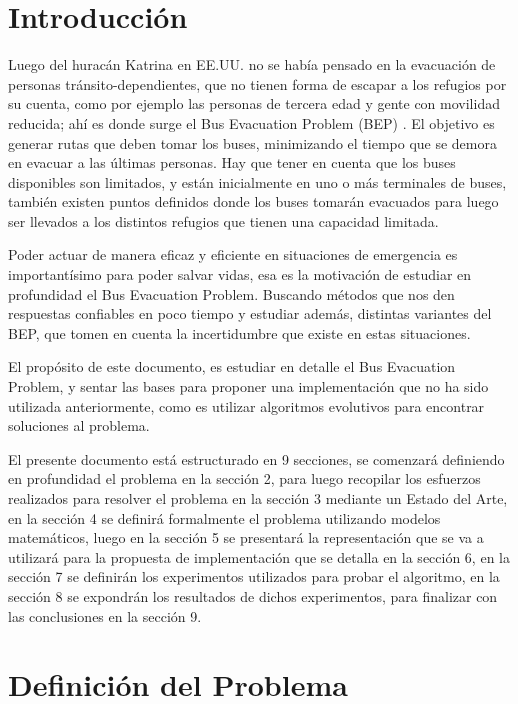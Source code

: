 \documentclass[letter, 10pt]{article}
\begin{document}
\section{Introducci\'on}
    Luego del huracán Katrina en EE.UU. no se había pensado en la evacuación de personas tránsito-dependientes, que no tienen forma de escapar a los refugios por su cuenta, como por ejemplo las personas de tercera edad y gente con movilidad reducida; ahí es donde surge el Bus Evacuation Problem (BEP) \cite{bish2011planning}. El objetivo es generar rutas que deben tomar los buses, minimizando el tiempo que se demora en evacuar a las últimas personas. Hay que tener en cuenta que los buses disponibles son limitados, y están inicialmente en uno o más terminales de buses, también existen puntos definidos donde los buses tomarán evacuados para luego ser llevados a los distintos refugios que tienen una capacidad limitada.

Poder actuar de manera eficaz y eficiente en situaciones de emergencia es importantísimo para poder salvar vidas, esa es la motivación de estudiar en profundidad el Bus Evacuation Problem. Buscando métodos que nos den respuestas confiables en poco tiempo y estudiar además, distintas variantes del BEP, que tomen en cuenta la incertidumbre que existe en estas situaciones.

El propósito de este documento, es estudiar en detalle el Bus Evacuation Problem, y sentar las bases para proponer una implementación que no ha sido utilizada anteriormente, como es utilizar algoritmos evolutivos para encontrar soluciones al problema.

El presente documento está estructurado en 9 secciones, se comenzará definiendo en profundidad el problema en la sección 2, para luego recopilar los esfuerzos realizados para resolver el problema en la sección 3 mediante un Estado del Arte, en la sección 4 se definirá formalmente el problema utilizando modelos matemáticos, luego en la sección 5 se presentará la representación que se va a utilizará para la propuesta de implementación que se detalla en la sección 6, en la sección 7 se definirán los experimentos utilizados para probar el algoritmo, en la sección 8 se expondrán los resultados de dichos experimentos, para finalizar con las conclusiones en la sección 9.
    
\section{Definici\'on del Problema}
\end{document}
